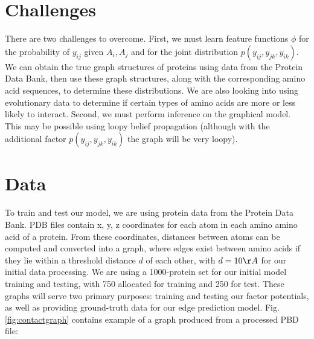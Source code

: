 \documentclass{article}
\begin{document}
\section{Challenges}
There are two challenges to overcome. First, we must learn feature functions $\phi$ for the probability of $y_{ij}$ given $A_i, A_j$ and for the joint distribution $p(y_{ij}, y_{jk}, y_{ik})$. We can obtain the true graph structures of proteins using data from the Protein Data Bank, then use these graph structures, along with the corresponding amino acid sequences, to determine these distributions. We are also looking into using evolutionary data to determine if certain types of amino acids are more or less likely to interact. Second, we must perform inference on the graphical model. This may be possible using loopy belief propagation (although with the additional factor $p(y_{ij}, y_{jk}, y_{ik})$ the graph will be very loopy).


\section{Data}
	To train and test our model, we are using protein data from the Protein Data Bank. PDB files contain x, y, z coordinates for each atom in each amino amino acid of a protein. From these coordinates, distances between atoms can be computed and converted into a graph, where edges exist between amino acids if they lie within a threshold distance $d$ of each other, with $d = 10 {\AA}$ for our initial data processing. We are using a 1000-protein set for our initial model training and testing, with 750 allocated for training and 250 for test. These graphs will serve two primary purposes: training and testing our factor potentials, as well as providing ground-truth data for our edge prediction model. Fig. \ref{fig:contactgraph} contains example of a graph produced from a processed PBD file:
\end{document}
